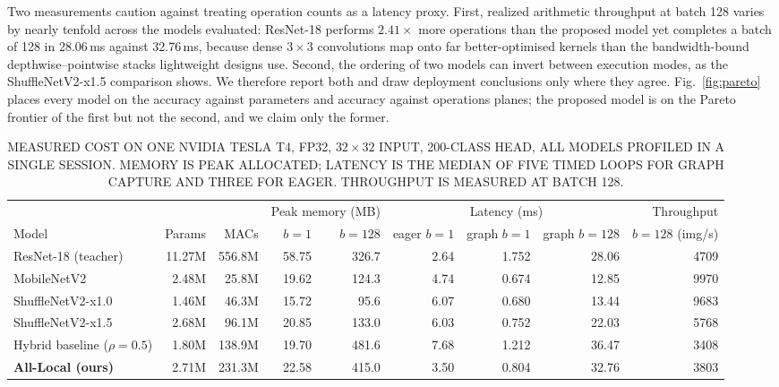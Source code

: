 Two measurements caution against treating operation counts as a latency proxy.
First, realized arithmetic throughput at batch 128 varies by nearly tenfold
across the models evaluated: ResNet-18 performs $2.41\times$ more operations
than the proposed model yet completes a batch of 128 in 28.06\,ms against
32.76\,ms, because dense $3\times3$ convolutions map onto far better-optimised
kernels than the bandwidth-bound depthwise--pointwise stacks lightweight
designs use. Second, the ordering of two models can invert between execution
modes, as the ShuffleNetV2-x1.5 comparison shows. We therefore report both and
draw deployment conclusions only where they agree. Fig.~\ref{fig:pareto}
places every model on the accuracy against parameters and accuracy against
operations planes; the proposed model is on the Pareto frontier of the first
but not the second, and we claim only the former.

\begin{table}[!t]
\renewcommand{\arraystretch}{1.15}
\caption{\uppercase{Measured cost on one NVIDIA Tesla T4, fp32, $32\times32$ input,
200-class head, all models profiled in a single session. Memory is peak
allocated; latency is the median of five timed loops for graph capture and
three for eager. Throughput is measured at batch 128.}}
\label{tab:cost}
\centering
\footnotesize
\begin{tabular}{@{}lrrrrrrrr@{}}
\toprule
& & & \multicolumn{2}{c}{Peak memory (MB)} & \multicolumn{3}{c}{Latency (ms)} & Throughput \\
\cmidrule(lr){4-5}\cmidrule(lr){6-8}
Model & Params & MACs & $b{=}1$ & $b{=}128$ & eager $b{=}1$ & graph $b{=}1$ & graph $b{=}128$ & $b{=}128$ (img/s) \\
\midrule
ResNet-18 (teacher) & 11.27M & 556.8M & 58.75 & 326.7 & 2.64 & 1.752 & 28.06 & 4709 \\
MobileNetV2 & 2.48M & 25.8M & 19.62 & 124.3 & 4.74 & 0.674 & 12.85 & 9970 \\
ShuffleNetV2-x1.0 & 1.46M & 46.3M & 15.72 & 95.6 & 6.07 & 0.680 & 13.44 & 9683 \\
ShuffleNetV2-x1.5 & 2.68M & 96.1M & 20.85 & 133.0 & 6.03 & 0.752 & 22.03 & 5768 \\
Hybrid baseline ($\rho{=}0.5$) & 1.80M & 138.9M & 19.70 & 481.6 & 7.68 & 1.212 & 36.47 & 3408 \\
\midrule
\textbf{All-Local (ours)} & 2.71M & 231.3M & 22.58 & 415.0 & 3.50 & 0.804 & 32.76 & 3803 \\
\bottomrule
\end{tabular}
\end{table}

